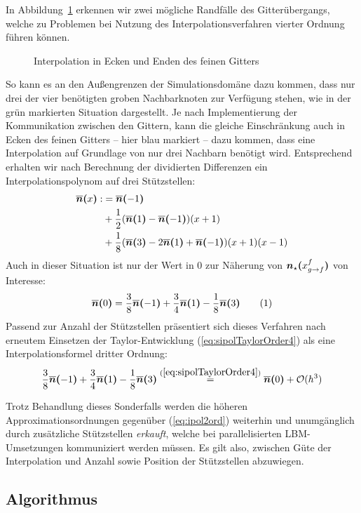 In Abbildung~\ref{fig:InterpolationEdgeCase} erkennen wir zwei mögliche Randfälle des Gitterübergangs, welche zu Problemen bei Nutzung des Interpolationsverfahren vierter Ordnung führen können.
\begin{figure}[h]
\centering

\caption{Interpolation in Ecken und Enden des feinen Gitters}
\label{fig:InterpolationEdgeCase}
\end{figure}

\noindent
So kann es an den Außengrenzen der Simulationsdomäne dazu kommen, dass nur drei der vier benötigten groben Nachbarknoten zur Verfügung stehen, wie in der grün markierten Situation dargestellt.
Je nach Implementierung der Kommunikation zwischen den Gittern, kann die gleiche Einschränkung auch in Ecken des feinen Gitters -- hier blau markiert -- dazu kommen, dass eine Interpolation auf Grundlage von nur drei Nachbarn benötigt wird. Entsprechend erhalten wir nach Berechnung der dividierten Differenzen ein Interpolationspolynom auf drei Stützstellen:
\begin{align*}
\overline{\boldsymbol{n}}\boldsymbol{(}{x}\boldsymbol{)} :&= \overline{\boldsymbol{n}}\boldsymbol{(}{-1}\boldsymbol{)} \\
&+ \frac{1}{2}(\overline{\boldsymbol{n}}\boldsymbol{(}{1}\boldsymbol{)}-\overline{\boldsymbol{n}}\boldsymbol{(}{-1}\boldsymbol{)})(x+1)\\
&+ \frac{1}{8}(\overline{\boldsymbol{n}}\boldsymbol{(}{3}\boldsymbol{)}-2\overline{\boldsymbol{n}}\boldsymbol{(}{1}\boldsymbol{)}+\overline{\boldsymbol{n}}\boldsymbol{(}{-1}\boldsymbol{)})(x+1)(x-1)
\end{align*}
Auch in dieser Situation ist nur der Wert in \(0\) zur Näherung von \(\boldsymbol{n}_{\star}\boldsymbol{(}{x_{g \to f}^f}\boldsymbol{)}\) von Interesse:
\[\sipolarg{0} = \frac{3}{8}\sipolarg{-1} + \frac{3}{4}\sipolarg{1} - \frac{1}{8}\sipolarg{3} \numberthis\label{eq:ipol3ord}\]
Passend zur Anzahl der Stützstellen präsentiert sich dieses Verfahren nach erneutem Einsetzen der Taylor-Entwicklung (\ref{eq:sipolTaylorOrder4}) als eine Interpolationsformel dritter Ordnung:
\[\frac{3}{8}\overline{\boldsymbol{n}}\boldsymbol{(}{-1}\boldsymbol{)} + \frac{3}{4}\overline{\boldsymbol{n}}\boldsymbol{(}{1}\boldsymbol{)} - \frac{1}{8}\overline{\boldsymbol{n}}\boldsymbol{(}{3}\boldsymbol{)} \stackrel{(\ref{eq:sipolTaylorOrder4})}{=} \overline{\boldsymbol{n}}\boldsymbol{(}{0}\boldsymbol{)} + \mathcal{O}(h^3)\]

Trotz Behandlung dieses Sonderfalls werden die höheren Approximationsordnungen gegenüber (\ref{eq:ipol2ord}) weiterhin und unumgänglich durch zusätzliche Stützstellen \emph{erkauft}, welche bei parallelisierten LBM-Umsetzungen kommuniziert werden müssen. Es gilt also, zwischen Güte der Interpolation und Anzahl sowie Position der Stützstellen abzuwiegen.

\newpage
\subsection{Algorithmus}\label{kap:Algorithmus}

